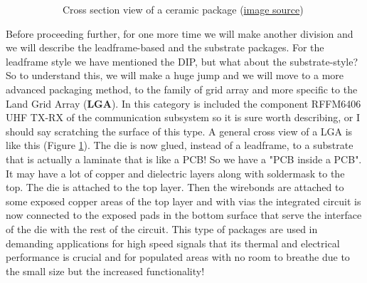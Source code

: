 \documentclass[final]{cubedoc}
\begin{document}
\begin{figure}[h!]
\begin{subfigure}{.5\textwidth}
			\caption{Cross section view of a ceramic package \small{(\href{https://web.archive.org/web/20200818153102/https://commons.wikimedia.org/wiki/File:Cer-DIP_package_sideview.PNG}{image source})}}
			\label{fig:sub2}
		\end{subfigure}
		\caption{}
		\label{fig:test}
	\end{figure}
	
	Before proceeding further, for one more time we will make another division and we will describe the leadframe-based and the substrate packages.
	For the leadframe style we have mentioned the DIP, but what about the substrate-style? So to understand this, we will make a huge jump and we will move to a more advanced packaging method, to the family of grid array and more specific to the Land Grid Array (\textbf{LGA}). In this category is included the component RFFM6406 UHF TX-RX of the communication subsystem so it is sure worth describing, or I should say scratching the surface of this type. A general cross view of a LGA is like this (Figure \ref{fig:sub2}). The die is now glued, instead of a leadframe, to a substrate that is actually a laminate that is like a PCB! So we have a "PCB inside a PCB". It may have a lot of copper and dielectric layers along with soldermask to the top. The die is attached to the top layer. Then the wirebonds are attached to some exposed copper areas of the top layer and with vias the integrated circuit is now connected to the exposed pads in the bottom surface that serve the interface of the die with the rest of the circuit. This type of packages are used in demanding applications for high speed signals that its thermal and electrical performance is crucial and for populated areas with no room to breathe due to the small size but the increased functionality! 
	
\end{document}
